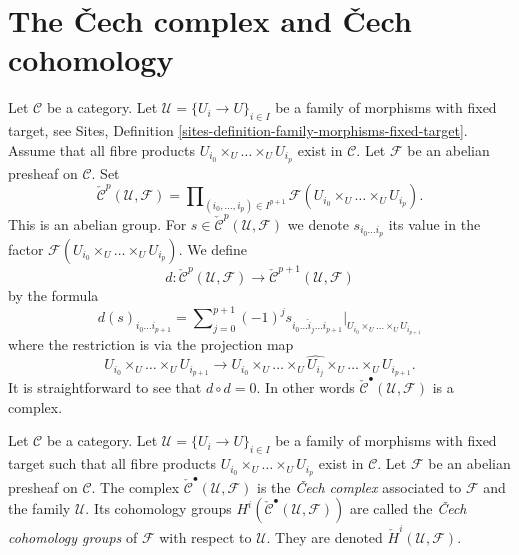 \section{The {\v C}ech complex and {\v C}ech cohomology}
\label{section-cech}

\noindent
Let $\mathcal{C}$ be a category. Let $\mathcal{U} = \{U_i \to U\}_{i \in I}$
be a family of morphisms with fixed target, see
Sites, Definition \ref{sites-definition-family-morphisms-fixed-target}.
Assume that all fibre products $U_{i_0} \times_U \ldots \times_U U_{i_p}$
exist in $\mathcal{C}$. Let $\mathcal{F}$ be an abelian presheaf on
$\mathcal{C}$. Set
$$
\check{\mathcal{C}}^p(\mathcal{U}, \mathcal{F})
=
\prod\nolimits_{(i_0, \ldots, i_p) \in I^{p + 1}}
\mathcal{F}(U_{i_0} \times_U \ldots \times_U U_{i_p}).
$$
This is an abelian group. For
$s \in \check{\mathcal{C}}^p(\mathcal{U}, \mathcal{F})$ we denote
$s_{i_0\ldots i_p}$ its value in the factor
$\mathcal{F}(U_{i_0} \times_U \ldots \times_U U_{i_p})$.
We define
$$
d : \check{\mathcal{C}}^p(\mathcal{U}, \mathcal{F})
\longrightarrow
\check{\mathcal{C}}^{p + 1}(\mathcal{U}, \mathcal{F})
$$
by the formula
\begin{equation}
\label{equation-d-cech}
d(s)_{i_0\ldots i_{p + 1}} =
\sum\nolimits_{j = 0}^{p + 1}
(-1)^j s_{i_0\ldots \hat i_j \ldots i_{p + 1}}
|_{U_{i_0} \times_U \ldots \times_U U_{i_{p + 1}}}
\end{equation}
where the restriction is via the projection map
$$
U_{i_0} \times_U \ldots \times_U U_{i_{p + 1}} \longrightarrow
U_{i_0} \times_U \ldots \times_U \widehat{U_{i_j}} \times_U
\ldots \times_U U_{i_{p + 1}}.
$$
It is straightforward to see that $d \circ d = 0$. In other words
$\check{\mathcal{C}}^\bullet(\mathcal{U}, \mathcal{F})$ is a complex.

\begin{definition}
\label{definition-cech-complex}
Let $\mathcal{C}$ be a category. Let $\mathcal{U} = \{U_i \to U\}_{i \in I}$
be a family of morphisms with fixed target such that all fibre products
$U_{i_0} \times_U \ldots \times_U U_{i_p}$ exist in $\mathcal{C}$.
Let $\mathcal{F}$ be an abelian presheaf on $\mathcal{C}$.
The complex $\check{\mathcal{C}}^\bullet(\mathcal{U}, \mathcal{F})$
is the {\it {\v C}ech complex} associated to $\mathcal{F}$ and the
family $\mathcal{U}$. Its cohomology groups
$H^i(\check{\mathcal{C}}^\bullet(\mathcal{U}, \mathcal{F}))$ are
called the {\it {\v C}ech cohomology groups} of $\mathcal{F}$ with respect
to $\mathcal{U}$. They are denoted $\check H^i(\mathcal{U}, \mathcal{F})$.
\end{definition}

